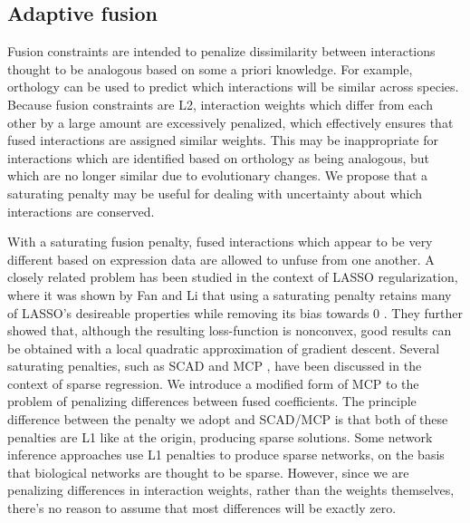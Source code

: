 \documentclass[11pt]{article}
\begin{document}

\subsection{Adaptive fusion}
Fusion constraints are intended to penalize dissimilarity between interactions thought to be analogous based on some a priori knowledge. For example, orthology can be used to predict which interactions will be similar across species. Because fusion constraints are L2, interaction weights which differ from each other by a large amount are excessively penalized, which effectively ensures that fused interactions are assigned similar weights. This may be inappropriate for interactions which are identified based on orthology as being analogous, but which are no longer similar due to evolutionary changes. We propose that a saturating penalty may be useful for dealing with uncertainty about which interactions are conserved. 

With a saturating fusion penalty, fused interactions which appear to be very different based on expression data are allowed to unfuse from one another. A closely related problem has been studied in the context of LASSO regularization, where it was shown by Fan and Li that using a saturating penalty retains many of LASSO's desireable properties while removing its bias towards 0 \cite{fan2001variable}. They further showed that, although the resulting loss-function is nonconvex, good results can be obtained with a local quadratic approximation of gradient descent. Several saturating penalties, such as SCAD \cite{fan2001variable} and MCP \cite{zhang2010nearly}, have been discussed in the context of sparse regression. We introduce a modified form of MCP to the problem of penalizing differences between fused coefficients. The principle difference between the penalty we adopt and SCAD/MCP is that both of these penalties are L1 like at the origin, producing sparse solutions. Some network inference approaches use L1 penalties to produce sparse networks, on the basis that biological networks are thought to be sparse. However, since we are penalizing differences in interaction weights, rather than the weights themselves, there's no reason to assume that most differences will be exactly zero. 
\end{document}
